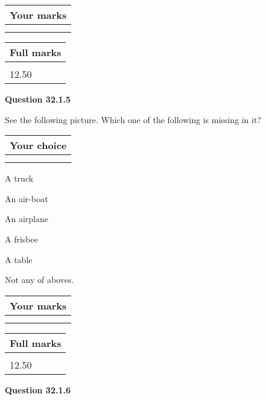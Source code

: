 \documentclass[12pt]{article}
\begin{document}
 
 
 

 
 
\vspace{0.3in}
  
\vspace{0.2in}
  
         \begin{tabular}{|l|}
\hline
 Your marks  \\
\hline
 \\ 
 \\ 
\hline
\end{tabular}
\hspace{0.05in} \begin{tabular}{|l|}
\hline
 Full marks  \\
\hline
 \\ 
12.50 \\
\hline
\end{tabular}
{\textbf{\Large{Question
32.1.5 
}}}
  
  
See the following picture.
Which one of the following is missing in it?
  
  
\noindent\hspace{3.0in} \begin{tabular}{|l|}
\hline
Your choice \\
\hline
 \\ 
 \\ 
\hline
\end{tabular}
  
  
 
 
A truck
 
 
An air-boat
 
 
An airplane
 
 
A frisbee
 
 
A table
 
 
  Not any of aboves.
 
 
 
\vspace{0.3in}
  
\vspace{0.2in}
  
         \begin{tabular}{|l|}
\hline
 Your marks  \\
\hline
 \\ 
 \\ 
\hline
\end{tabular}
\hspace{0.05in} \begin{tabular}{|l|}
\hline
 Full marks  \\
\hline
 \\ 
12.50 \\
\hline
\end{tabular}
{\textbf{\Large{Question
32.1.6 
}}}
  
\end{document}
